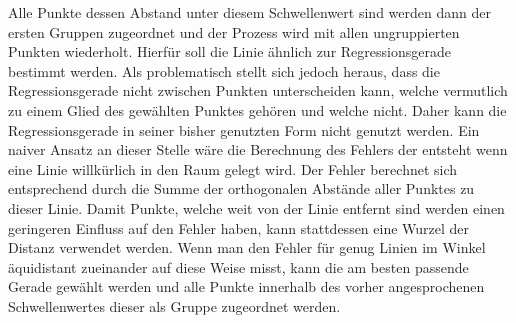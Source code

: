 Alle Punkte dessen Abstand unter diesem Schwellenwert sind werden dann der ersten Gruppen zugeordnet und der Prozess wird mit allen ungruppierten Punkten wiederholt.
Hierfür soll die Linie ähnlich zur Regressionsgerade bestimmt werden.
Als problematisch stellt sich jedoch heraus, dass die Regressionsgerade nicht zwischen Punkten unterscheiden kann, welche vermutlich zu einem Glied des gewählten Punktes gehören und welche nicht.
Daher kann die Regressionsgerade in seiner bisher genutzten Form nicht genutzt werden.
Ein naiver Ansatz an dieser Stelle wäre die Berechnung des Fehlers der entsteht wenn eine Linie willkürlich in den Raum gelegt wird.
Der Fehler berechnet sich entsprechend durch die Summe der orthogonalen Abstände aller Punktes zu dieser Linie.
Damit Punkte, welche weit von der Linie entfernt sind werden einen geringeren Einfluss auf den Fehler haben, kann stattdessen eine Wurzel der Distanz verwendet werden.
Wenn man den Fehler für genug Linien im Winkel äquidistant zueinander auf diese Weise misst, kann die am besten passende Gerade gewählt werden und alle Punkte innerhalb des vorher angesprochenen Schwellenwertes dieser als Gruppe zugeordnet werden.

